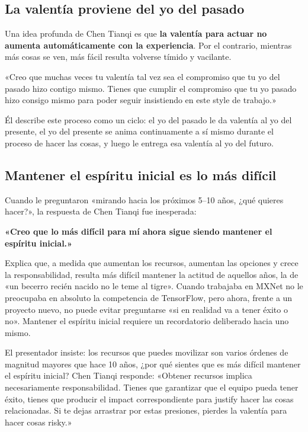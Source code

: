 \documentclass[a4paper]{article}
\begin{document}
\subsection{La valentía proviene del yo del pasado}

Una idea profunda de Chen Tianqi es que \textbf{la valentía para actuar no aumenta automáticamente con la experiencia}. Por el contrario, mientras más cosas se ven, más fácil resulta volverse tímido y vacilante.

«Creo que muchas veces tu valentía tal vez sea el compromiso que tu yo del pasado hizo contigo mismo. Tienes que cumplir el compromiso que tu yo pasado hizo consigo mismo para poder seguir insistiendo en este style de trabajo.»

Él describe este proceso como un ciclo: el yo del pasado le da valentía al yo del presente, el yo del presente se anima continuamente a sí mismo durante el proceso de hacer las cosas, y luego le entrega esa valentía al yo del futuro.

\subsection{Mantener el espíritu inicial es lo más difícil}

Cuando le preguntaron «mirando hacia los próximos 5--10 años, ¿qué quieres hacer?», la respuesta de Chen Tianqi fue inesperada:

\textbf{«Creo que lo más difícil para mí ahora sigue siendo mantener el espíritu inicial.»}

Explica que, a medida que aumentan los recursos, aumentan las opciones y crece la responsabilidad, resulta más difícil mantener la actitud de aquellos años, la de «un becerro recién nacido no le teme al tigre». Cuando trabajaba en MXNet no le preocupaba en absoluto la competencia de TensorFlow, pero ahora, frente a un proyecto nuevo, no puede evitar preguntarse «si en realidad va a tener éxito o no». Mantener el espíritu inicial requiere un recordatorio deliberado hacia uno mismo.

El presentador insiste: los recursos que puedes movilizar son varios órdenes de magnitud mayores que hace 10 años, ¿por qué sientes que es más difícil mantener el espíritu inicial? Chen Tianqi responde: «Obtener recursos implica necesariamente responsabilidad. Tienes que garantizar que el equipo pueda tener éxito, tienes que producir el impact correspondiente para justify hacer las cosas relacionadas. Si te dejas arrastrar por estas presiones, pierdes la valentía para hacer cosas risky.»
\end{document}
